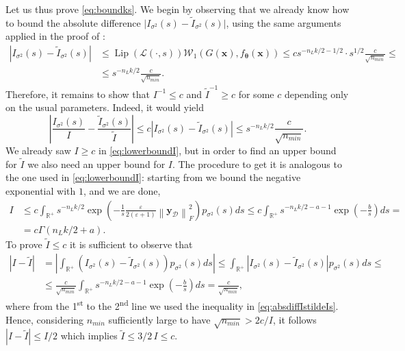 \documentclass[a4paper, 11pt, reqno]{amsart}
\theoremstyle{plain}
\theoremstyle{remark}
\theoremstyle{definition}
\newcommand{\wass}[3][2]{\mathcal{W}_{#1}\left(#2, #3\right)}
\newcommand{\real}{\mathbb{R}}
\newcommand{\norm}[1]{\left\lVert#1\right\rVert}
\newcommand{\lipschitz}[1]{\operatorname{Lip}\left(#1\right)}
\renewcommand{\exp}[1]{\operatorname{exp}\left(#1\right)}
\let\epsilon\varepsilon
\begin{document}
Let us thus prove \cref{eq:boundks}. We begin by observing that we already know how to bound the absolute difference $\big|\mathit{I}_{\sigma^2}(s) - \widetilde{\mathit{I}}_{\sigma^2}(s)\big|$, using the same arguments applied in the proof of :
\begin{equation} \label{eq:absdiffIstildeIs}
	\begin{aligned}
		\left|\mathit{I}_{\sigma^2}(s) - \widetilde{\mathit{I}}_{\sigma^2}(s)\right| & \leq \lipschitz{\mathcal{L}(\cdot, s)} \wass[1]{G(\bm{x})}{f_{\bm{\theta}}(\bm{x})} \leq c s^{-n_L k / 2 - 1/2} \cdot s^{1/2} \frac{c}{\sqrt{n_{min}}} \leq \\
		& \leq s^{- n_L k /2} \frac{c}{\sqrt{n_{min}}}.
	\end{aligned}
\end{equation}
Therefore, it remains to show that $\mathit{I}^{-1} \leq c$ and $\widetilde{\mathit{I}}^{-1} \geq c$ for some $c$ depending only on the usual parameters.
Indeed, it would yield
\begin{equation*}
	\left|\frac{\mathit{I}_{\sigma^2}(s)}{\mathit{I}} - \frac{\widetilde{\mathit{I}}_{\sigma^2}(s)}{\widetilde{\mathit{I}}}\right| \leq c \left|\mathit{I}_{\sigma^2}(s) - \widetilde{\mathit{I}}_{\sigma^2}(s)\right| \leq s^{- n_L k /2} \frac{c}{\sqrt{n_{min}}}.
\end{equation*}
We already saw $\mathit{I} \geq c$ in \cref{eq:lowerboundI}, but in order to find an upper bound for $\widetilde{\mathit{I}}$ we also need an upper bound for $\mathit{I}$. 
The procedure to get it is analogous to the one used in \cref{eq:lowerboundI}: starting from  we bound the negative exponential with $1$, and we are done,
\begin{align*}
	\mathit{I} & \leq c \int_{\real^+} s^{-n_L k / 2} \exp{-\frac{1}{s} \frac{\epsilon}{2 (\epsilon + 1)} \norm{\bm{y}_{\mathcal{D}}}_F^2} p_{\sigma^2}(s) ds \leq c \int_{\real^+} s^{-n_L k / 2 - a - 1} \exp{-\frac{b}{s}} ds = \\
	& = c \Gamma\left(n_L k / 2 + a\right).
\end{align*}
To prove $\widetilde{\mathit{I}} \leq c$ it is sufficient to observe that 
\begin{align*}
	\left|\mathit{I} - \widetilde{\mathit{I}}\right| & = \left|\int_{\real^+} \left(\mathit{I}_{\sigma^2}(s) - \widetilde{\mathit{I}}_{\sigma^2}(s)\right) p_{\sigma^2}(s) ds\right| \leq \int_{\real^+} \left|\mathit{I}_{\sigma^2}(s) - \widetilde{\mathit{I}}_{\sigma^2}(s)\right| p_{\sigma^2}(s) ds \leq \\
	& \leq \frac{c}{\sqrt{n_{min}}} \int_{\real^+} s^{-n_L k / 2 - a - 1} \exp{-\frac{b}{s}} ds = \frac{c}{\sqrt{n_{min}}},
\end{align*}
where from the 1\textsuperscript{st} to the 2\textsuperscript{nd} line we used the inequality in \cref{eq:absdiffIstildeIs}.
Hence, considering $n_{min}$ sufficiently large to have $\sqrt{n_{min}} > 2c / \mathit{I}$, it follows $|\mathit{I} - \widetilde{\mathit{I}}| \leq \mathit{I} / 2$ which implies $\widetilde{\mathit{I}} \leq 3/2 \, \mathit{I} \leq c$.
\end{document}
